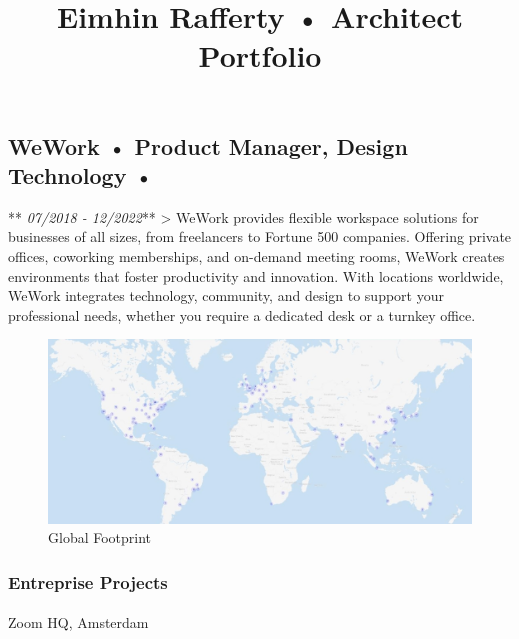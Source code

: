\documentclass[
]{article}
\title{Eimhin Rafferty • Architect Portfolio}
\author{}
\date{}
\makeatletter
\let\oldparagraph\paragraph
\renewcommand{\paragraph}{
    \@ifstar
      \xxxParagraphStar
      \xxxParagraphNoStar
  }
\newcommand{\xxxParagraphStar}[1]{\oldparagraph*{#1}\mbox{}}
\newcommand{\xxxParagraphNoStar}[1]{\oldparagraph{#1}\mbox{}}
\makeatother
\begin{document}
\maketitle


\subsection{WeWork • Product Manager, Design Technology
•}\label{wework-product-manager-design-technology}

** \emph{07/2018 - 12/2022}** \textgreater{} WeWork provides flexible
workspace solutions for businesses of all sizes, from freelancers to
Fortune 500 companies. Offering private offices, coworking memberships,
and on-demand meeting rooms, WeWork creates environments that foster
productivity and innovation. With locations worldwide, WeWork integrates
technology, community, and design to support your professional needs,
whether you require a dedicated desk or a turnkey office.

\begin{figure}[H]

{\centering \includegraphics{assets/WeWork/WeWorkMap.jpg}

}

\caption{Global Footprint}

\end{figure}%

\subsubsection{Entreprise Projects}\label{entreprise-projects}

\paragraph{Zoom HQ, Amsterdam}\label{zoom-hq-amsterdam}
\end{document}
